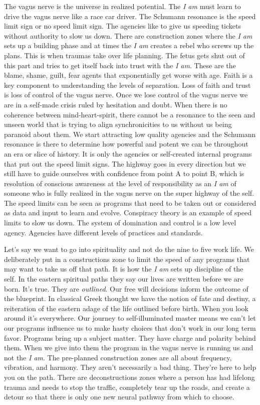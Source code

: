 The vagus nerve is the universe in realized potential. The \emph{I am}
must learn to drive the vagus nerve like a race car driver. The Schumann
resonance is the speed limit sign or no speed limit sign. The agencies
like to give us speeding tickets without authority to slow us down.
There are construction zones where the \emph{I am} sets up a building
phase and at times the \emph{I am} creates a rebel who screws up the
plans. This is when traumas take over life planning. The fetus gets shut
out of this part and tries to get itself back into trust with the
\emph{I am}. These are the blame, shame, guilt, fear agents that
exponentially get worse with age. Faith is a key component to
understanding the levels of separation. Loss of faith and trust is loss
of control of the vagus nerve. Once we lose control of the vagus nerve
we are in a self-made crisis ruled by hesitation and doubt. When there
is no coherence between mind-heart-spirit, there cannot be a resonance
to the seen and unseen world that is trying to align synchronicities to
us without us being paranoid about them. We start attracting low quality
agencies and the Schumann resonance is there to determine how powerful
and potent we can be throughout an era or slice of history. It is only
the agencies or self-created internal programs that put out the speed
limit signs. The highway goes in every direction but we still have to
guide ourselves with confidence from point A to point B, which is
resolution of conscious awareness at the level of responsibility as an
\emph{I am} of someone who is fully realized in the vagus nerve on the
super highway of the self. The speed limits can be seen as programs that
need to be taken out or considered as data and input to learn and
evolve. Conspiracy theory is an example of speed limits to slow us down.
The system of domination and control is a low level agency. Agencies
have different levels of practices and standards.

Let's say we want to go into spirituality and not do the nine to five
work life. We deliberately put in a constructions zone to limit the
speed of any programs that may want to take us off that path. It is how
the \emph{I am} sets up discipline of the self. In the eastern spiritual
paths they say our lives are written before we are born. It's true. They
are \emph{outlined}. Our free will decisions inform the outcome of the
blueprint. In classical Greek thought we have the notion of fate and
destiny, a reiteration of the eastern adage of the life outlined before
birth. When you look around it's everywhere. Our journey to
self-illuminated master means we can't let our programs influence us to
make hasty choices that don't work in our long term favor. Programs
bring up a subject matter. They have charge and polarity behind them.
When we give into them the program in the vagus nerve is running us and
not the \emph{I am}. The pre-planned construction zones are all about
frequency, vibration, and harmony. They aren't necessarily a bad thing.
They're here to help you on the path. There are deconstructions zones
where a person has had lifelong trauma and needs to stop the traffic,
completely tear up the roads, and create a detour so that there is only
one new neural pathway from which to choose.

